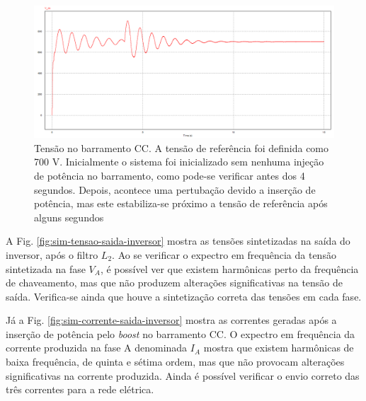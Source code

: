 \begin{figure}[!hbt]
	\begin{center}
    \includegraphics[width=\textwidth]{figuras/sim_figures/sistema_completo/tensao_barramento.PNG}
    \caption{Tensão no barramento CC. A tensão de referência foi definida como 700 V. Inicialmente o sistema foi inicializado sem nenhuma injeção de potência no barramento, como pode-se verificar antes dos 4 segundos. Depois, acontece uma pertubação devido a inserção de potência, mas este estabiliza-se próximo a tensão de referência após alguns segundos}
    \label{fig:sim-tensao-barramento}
    \end{center}
\end{figure}

A Fig. \ref{fig:sim-tensao-saida-inversor} mostra as tensões sintetizadas na saída do inversor, após o filtro $L_2$.
Ao se verificar o expectro em frequência da tensão sintetizada na fase $V_A$, é possível ver que existem harmônicas perto da frequência de chaveamento, mas que não produzem alterações significativas na tensão de saída. 
Verifica-se ainda que houve a sintetização correta das tensões em cada fase.

Já a Fig. \ref{fig:sim-corrente-saida-inversor} mostra as correntes geradas após a inserção de potência pelo \textit{boost} no barramento CC.
O expectro em frequência da corrente produzida na fase A denominada $I_A$ mostra que existem harmônicas de baixa frequência, de quinta e sétima ordem, mas que não provocam alterações significativas na corrente produzida.
Ainda é possível verificar o envio correto das três correntes para a rede elétrica.

